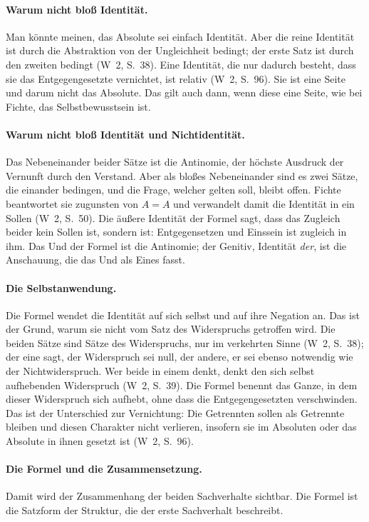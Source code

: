 \documentclass[11pt,a4paper]{article}
\newcommand{\Werke}[1]{(W~2, S.~#1)}
\begin{document}
\paragraph{Warum nicht bloß Identität.}
Man könnte meinen, das Absolute sei einfach Identität. Aber die reine Identität ist durch die Abstraktion von der Ungleichheit bedingt; der erste Satz ist durch den zweiten bedingt \Werke{38}. Eine Identität, die nur dadurch besteht, dass sie das Entgegengesetzte vernichtet, ist relativ \Werke{96}. Sie ist eine Seite und darum nicht das Absolute. Das gilt auch dann, wenn diese eine Seite, wie bei Fichte, das Selbstbewusstsein ist.

\paragraph{Warum nicht bloß Identität und Nichtidentität.}
Das Nebeneinander beider Sätze ist die Antinomie, der höchste Ausdruck der Vernunft durch den Verstand. Aber als bloßes Nebeneinander sind es zwei Sätze, die einander bedingen, und die Frage, welcher gelten soll, bleibt offen. Fichte beantwortet sie zugunsten von $A = A$ und verwandelt damit die Identität in ein Sollen \Werke{50}. Die äußere Identität der Formel sagt, dass das Zugleich beider kein Sollen ist, sondern ist: \glqq Entgegensetzen und Einssein ist zugleich in ihm\grqq{}. Das Und der Formel ist die Antinomie; der Genitiv, Identität \emph{der}, ist die Anschauung, die das Und als Eines fasst.

\paragraph{Die Selbstanwendung.}
Die Formel wendet die Identität auf sich selbst und auf ihre Negation an. Das ist der Grund, warum sie nicht vom Satz des Widerspruchs getroffen wird. Die beiden Sätze sind \glqq Sätze des Widerspruchs, nur im verkehrten Sinne\grqq{} \Werke{38}; der eine sagt, der Widerspruch sei null, der andere, er sei ebenso notwendig wie der Nichtwiderspruch. Wer beide in einem denkt, denkt den \glqq sich selbst aufhebenden Widerspruch\grqq{} \Werke{39}. Die Formel benennt das Ganze, in dem dieser Widerspruch sich aufhebt, ohne dass die Entgegengesetzten verschwinden. Das ist der Unterschied zur Vernichtung: Die Getrennten \glqq sollen als Getrennte bleiben und diesen Charakter nicht verlieren, insofern sie im Absoluten oder das Absolute in ihnen gesetzt ist\grqq{} \Werke{96}.

\paragraph{Die Formel und die Zusammensetzung.}
Damit wird der Zusammenhang der beiden Sachverhalte sichtbar. Die Formel ist die Satzform der Struktur, die der erste Sachverhalt beschreibt.
\end{document}
